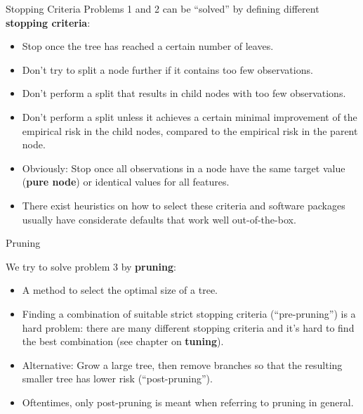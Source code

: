 \documentclass[11pt,compress,t,notes=noshow, xcolor=table]{beamer}
\begin{document}
\begin{vbframe}{Stopping Criteria}
Problems 1 and 2 can be \enquote{solved} by defining different \textbf{stopping criteria}:
  \begin{itemize}
    \item Stop once the tree has reached a certain number of leaves.
    \item Don't try to split a node further if it contains too few observations.
    \item Don't perform a split that results in child nodes with too few observations.
    \item Don't perform a split unless it achieves a certain minimal improvement of the empirical risk in the child nodes, compared to the empirical risk in the parent node.
    \item Obviously: Stop once all observations in a node have the same target value (\textbf{pure node}) or identical values for all features. 
    \item There exist heuristics on how to select these criteria and software packages usually have considerate defaults that work well out-of-the-box.
  \end{itemize}
\end{vbframe}

\begin{vbframe}{Pruning}

We try to solve problem 3 by \textbf{pruning}:

\begin{itemize}
\item A method to select the optimal size of a tree.
\item Finding a combination of suitable strict stopping criteria (\enquote{pre-pruning}) is a hard problem: there are many different stopping criteria and it's hard to find the best combination (see chapter on \textbf{tuning}).
\item Alternative: Grow a large tree, then remove branches so that the resulting smaller tree has lower risk (\enquote{post-pruning}).
\item Oftentimes, only post-pruning is meant when referring to pruning in general.

\end{itemize}
\end{vbframe}
\end{document}
